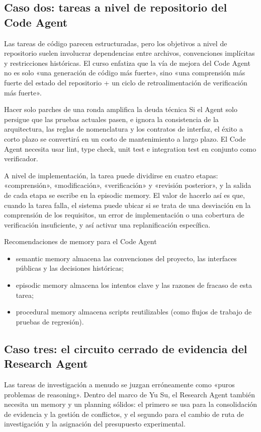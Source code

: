 \documentclass[a4paper]{article}
\begin{document}
\subsection{Caso dos: tareas a nivel de repositorio del Code Agent}
Las tareas de código parecen estructuradas, pero los objetivos a nivel de repositorio suelen involucrar dependencias entre archivos, convenciones implícitas y restricciones históricas. El curso enfatiza que la vía de mejora del Code Agent no es solo «una generación de código más fuerte», sino «una comprensión más fuerte del estado del repositorio + un ciclo de retroalimentación de verificación más fuerte».

\begin{warningbox}{Hacer solo parches de una ronda amplifica la deuda técnica}
Si el Agent solo persigue que las pruebas actuales pasen, e ignora la consistencia de la arquitectura, las reglas de nomenclatura y los contratos de interfaz, el éxito a corto plazo se convertirá en un costo de mantenimiento a largo plazo. El Code Agent necesita usar lint, type check, unit test e integration test en conjunto como verificador.
\end{warningbox}

A nivel de implementación, la tarea puede dividirse en cuatro etapas: «comprensión», «modificación», «verificación» y «revisión posterior», y la salida de cada etapa se escribe en la episodic memory. El valor de hacerlo así es que, cuando la tarea falla, el sistema puede ubicar si se trata de una desviación en la comprensión de los requisitos, un error de implementación o una cobertura de verificación insuficiente, y así activar una replanificación específica.

\begin{knowledgebox}{Recomendaciones de memory para el Code Agent}
\begin{itemize}
    \item semantic memory almacena las convenciones del proyecto, las interfaces públicas y las decisiones históricas;
    \item episodic memory almacena los intentos clave y las razones de fracaso de esta tarea;
    \item procedural memory almacena scripts reutilizables (como flujos de trabajo de pruebas de regresión).
\end{itemize}
\end{knowledgebox}

\subsection{Caso tres: el circuito cerrado de evidencia del Research Agent}
Las tareas de investigación a menudo se juzgan erróneamente como «puros problemas de reasoning». Dentro del marco de Yu Su, el Research Agent también necesita un memory y un planning sólidos: el primero se usa para la consolidación de evidencia y la gestión de conflictos, y el segundo para el cambio de ruta de investigación y la asignación del presupuesto experimental.
\end{document}
